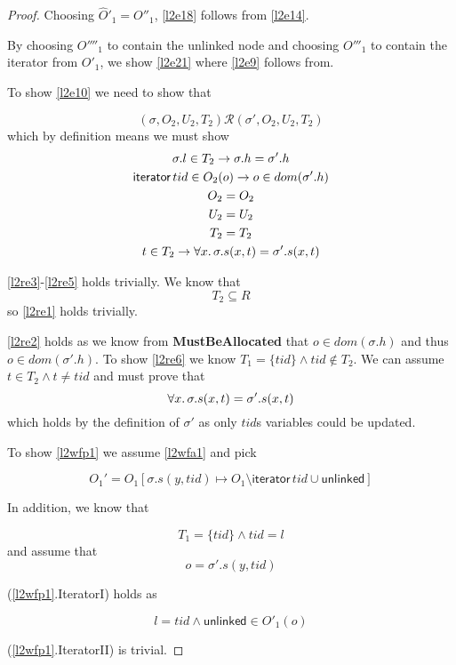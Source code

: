 \begin{proof}
Choosing $\hat{O}'_{1} = O''_{1}$, \ref{l2e18} follows from \ref{l2e14}.

By choosing $O''''_{1}$ to contain the unlinked node and choosing $O'''_{1}$ to contain the iterator from ${O}'_{1}$, we show \ref{l2e21} where \ref{l2e9} follows from.

To show \ref{l2e10} we need to show that 

\[
(\sigma, O_{2}, U_{2}, T_{2}) \mathcal{R} (\sigma', O_{2}, U_{2}, T_{2})
\]
which by definition means we must show
\begin{gather}
\label{l2re1}
\sigma.l \in T_{2} \rightarrow \sigma.h = \sigma'.h
\\
\label{l2re2}
\textsf{iterator} \, tid \in O_{2}(o) \rightarrow  o \in dom(\sigma'.h)
\\
\label{l2re3}
O_{2} = O_{2}
\\
\label{l2re4}
U_{2} = U_{2}
\\
\label{l2re5}
T_{2} = T_{2}
\\
\label{l2re6}
t \in T_{2} \rightarrow \forall x \ldotp \sigma.s(x,t) = \sigma'.s(x,t)
\end{gather}


\ref{l2re3}-\ref{l2re5} holds trivially. We know that 
\[T_{2} \subseteq R\]
so \ref{l2re1} holds trivially.

\ref{l2re2} holds as we know from \textsf{\textbf{MustBeAllocated}} that $o \in dom(\sigma.h)$ and thus $o \in dom(\sigma'.h)$. To show \ref{l2re6} we know $T_{1} = \{tid\} \land tid \notin T_{2}$.  We can assume $t \in T_{2} \land t \ne tid$ and must prove that 
\[
\forall x \ldotp \sigma.s(x,t) = \sigma'.s(x,t) 
\]
which holds by the definition of $\sigma'$ as only $tid$s variables could be updated. 


To show \ref{l2wfp1} we assume \ref{l2wfa1} and pick

\[O_{1}' = O_{1}[\sigma.s(y,tid) \mapsto O_{1} \setminus \mathsf{iterator} \, tid \cup \mathsf{unlinked}] \]

In addition, we know  that 

\[T_{1}=\{tid\} \land tid= l\]
and  assume that 
\[o = \sigma'.s(y,tid)\]

(\ref{l2wfp1}.\textsf{IteratorI}) holds as 

\[ l =  tid \land \textsf{unlinked} \in O'_{1}(o)\]

(\ref{l2wfp1}.\textsf{IteratorII}) is trivial.


\end{proof}
